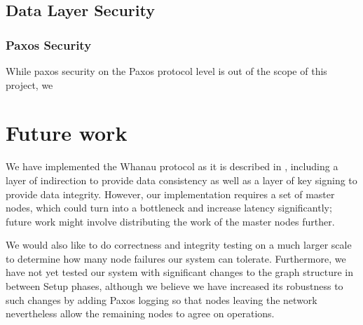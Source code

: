 \documentclass[letter]{article}
\begin{document}
\subsection{Data Layer Security}

\subsubsection{Paxos Security}
While paxos security on the Paxos protocol level is out of the scope of this project, we
\section{Future work}

We have implemented the Whanau protocol as it is described in
\cite{whanauthesis}, including a layer of indirection to provide
data consistency as well as a layer of key signing to provide
data integrity. However, our implementation requires a set of master
nodes, which could turn into a bottleneck and increase latency
significantly; future work might involve distributing the work of the
master nodes further.

We would also like to do correctness and integrity testing on a much
larger scale to determine how many node failures our system can tolerate.
Furthermore, we have not yet tested our system with significant changes
to the graph structure in between Setup phases, although we believe
we have increased its robustness to such changes by adding Paxos logging
so that nodes leaving the network nevertheless allow the remaining
nodes to agree on operations.

\printbibliography
\nocite{*}
\end{document}
